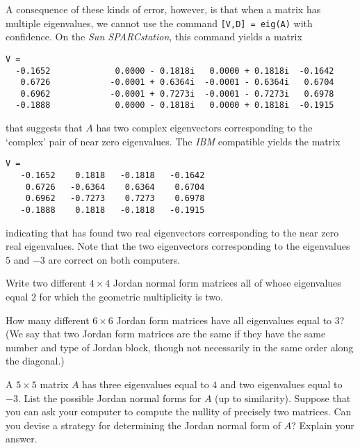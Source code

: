 \documentclass{ximera}
\begin{document}
A consequence of these kinds of error, however, is that when a matrix
has multiple eigenvalues, we cannot use the command {\tt [V,D] = eig(A)} 
with confidence. On the {\em Sun SPARCstation\/}, this command yields 
a matrix 
\begin{verbatim}
V = 
  -0.1652             0.0000 - 0.1818i   0.0000 + 0.1818i  -0.1642          
   0.6726            -0.0001 + 0.6364i  -0.0001 - 0.6364i   0.6704          
   0.6962            -0.0001 + 0.7273i  -0.0001 - 0.7273i   0.6978          
  -0.1888             0.0000 - 0.1818i   0.0000 + 0.1818i  -0.1915          
\end{verbatim}
that suggests that $A$ has two complex eigenvectors corresponding 
to the `complex' pair of near zero eigenvalues.  The {\em IBM\/} 
compatible yields the matrix
\begin{verbatim}
V = 
   -0.1652    0.1818   -0.1818   -0.1642
    0.6726   -0.6364    0.6364    0.6704
    0.6962   -0.7273    0.7273    0.6978
   -0.1888    0.1818   -0.1818   -0.1915
\end{verbatim}
indicating that \Matlab has found two real eigenvectors corresponding 
to the near zero real eigenvalues.  Note that the two eigenvectors
corresponding to the eigenvalues $5$ and $-3$ are correct on both 
computers.     

\EXER

\TEXER


\begin{exercise} \label{c10.5.2}
Write two different $4\times 4$ Jordan normal form matrices all
of whose eigenvalues equal $2$ for which the geometric
multiplicity is two.
\end{exercise}

\begin{exercise} \label{c10.5.2A}
How many different $6\times 6$ Jordan form matrices have all eigenvalues 
equal to $3$? (We say that two Jordan form matrices are the same 
if they have the same number and type of Jordan block, though not
necessarily in the same order along the diagonal.)
\end{exercise}

\begin{exercise}  \label{c10.5.2B}
A $5\times 5$ matrix $A$ has three eigenvalues equal
to $4$ and two eigenvalues equal to $-3$.  List the possible Jordan normal 
forms for $A$ (up to similarity).  Suppose that you can ask your computer to
compute the nullity of precisely two matrices.  Can you devise a strategy for
determining the Jordan normal form of $A$?  Explain your answer.
\end{exercise}
\end{document}
